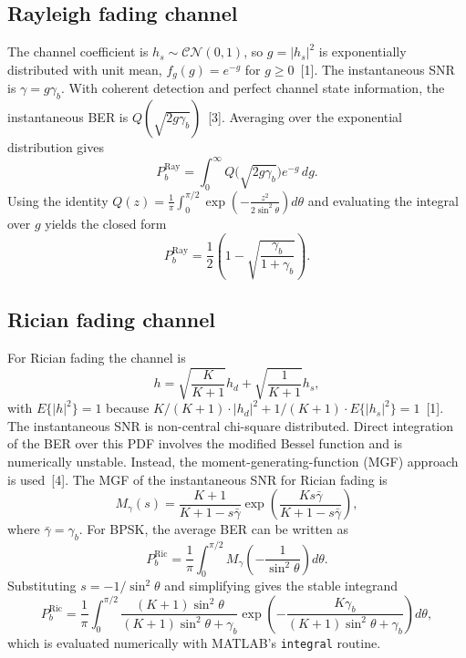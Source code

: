\documentclass[12pt,a4paper]{article}
\begin{document}
\subsection{Rayleigh fading channel}
The channel coefficient is $h_s\sim\mathcal{CN}(0,1)$, so $g=|h_s|^2$ is exponentially distributed with unit mean, $f_g(g)=e^{-g}$ for $g\ge 0$~[1]. The instantaneous SNR is $\gamma=g\gamma_b$. With coherent detection and perfect channel state information, the instantaneous BER is $Q(\sqrt{2g\gamma_b})$~[3]. Averaging over the exponential distribution gives
\begin{equation}
    P_b^{\text{Ray}}=\int_0^{\infty}Q\bigl(\sqrt{2g\gamma_b}\bigr)e^{-g}\,dg.
\end{equation}
Using the identity $Q(z)=\frac{1}{\pi}\int_0^{\pi/2}\exp\!\left(-\frac{z^2}{2\sin^2\theta}\right)d\theta$ and evaluating the integral over $g$ yields the closed form
\begin{equation}
    P_b^{\text{Ray}}=\frac{1}{2}\left(1-\sqrt{\frac{\gamma_b}{1+\gamma_b}}\right).
\end{equation}

\subsection{Rician fading channel}
For Rician fading the channel is
\begin{equation}
    h=\sqrt{\frac{K}{K+1}}h_d+\sqrt{\frac{1}{K+1}}h_s,
\end{equation}
with $E\{|h|^2\}=1$ because $K/(K+1)\cdot |h_d|^2 + 1/(K+1)\cdot E\{|h_s|^2\}=1$~[1]. The instantaneous SNR is non-central chi-square distributed. Direct integration of the BER over this PDF involves the modified Bessel function and is numerically unstable. Instead, the moment-generating-function (MGF) approach is used~[4]. The MGF of the instantaneous SNR for Rician fading is
\begin{equation}
    M_{\gamma}(s)=\frac{K+1}{K+1-s\bar{\gamma}}\exp\!\left(\frac{K s\bar{\gamma}}{K+1-s\bar{\gamma}}\right),
\end{equation}
where $\bar{\gamma}=\gamma_b$. For BPSK, the average BER can be written as
\begin{equation}
    P_b^{\text{Ric}}=\frac{1}{\pi}\int_0^{\pi/2}M_{\gamma}\!\left(-\frac{1}{\sin^2\theta}\right)d\theta.
\end{equation}
Substituting $s=-1/\sin^2\theta$ and simplifying gives the stable integrand
\begin{equation}
    P_b^{\text{Ric}}=\frac{1}{\pi}\int_0^{\pi/2}
    \frac{(K+1)\sin^2\theta}{(K+1)\sin^2\theta+\gamma_b}
    \exp\!\left(-\frac{K\gamma_b}{(K+1)\sin^2\theta+\gamma_b}\right)d\theta,
\end{equation}
which is evaluated numerically with MATLAB's \texttt{integral} routine.
\end{document}
